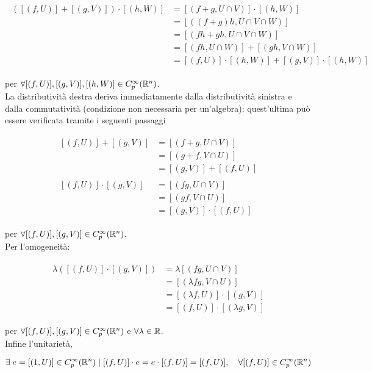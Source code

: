\begin{align}
	\begin{split}
		([(f,U)] + [(g,V)]) \cdot [(h,W)] &= [(f+g,U \cap V)] \cdot [(h,W)]\\
		&= [((f+g) h,U \cap V \cap W)]\\
		&= [(fh + gh,U \cap V \cap W)]\\
		&= [(fh,U \cap W)] + [(gh,V \cap W)]\\
		&= [(f,U)] \cdot [(h,W)] + [(g,V)] \cdot [(h,W)]
	\end{split}
\end{align}

per $ \forall [(f,U)], [(g,V)], [(h,W)] \in C_{p}^{\infty}(\mathbb{R}^{n}) $.\\
La distributività destra deriva immediatamente dalla distributività sinistra e dalla commutatività (condizione non necessaria per un'algebra): quest'ultima può essere verificata tramite i seguenti passaggi

\begin{align}
	\begin{split}
		[(f,U)] + [(g,V)] &= [(f+g,U \cap V)]\\
		&= [(g+f,V \cap U)]\\
		&= [(g,V)] + [(f,U)]\\\\
		[(f,U)] \cdot [(g,V)] &= [(fg,U \cap V)]\\
		&= [(gf,V \cap U)]\\
		&= [(g,V)] \cdot [(f,U)]
	\end{split}
\end{align}

per $ \forall [(f,U)], [(g,V)] \in C_{p}^{\infty}(\mathbb{R}^{n}) $.\\
Per l'omogeneità:

\begin{align}
	\begin{split}
		\lambda ([(f,U)] \cdot [(g,V)]) &= \lambda [(fg,U \cap V)]\\
		&= [(\lambda fg,V \cap U)]\\
		&= [(\lambda f,U)] \cdot [(g,V)]\\
		&= [(f,U)] \cdot [(\lambda g,V)]
	\end{split}
\end{align}

per $ \forall [(f,U)], [(g,V)] \in C_{p}^{\infty}(\mathbb{R}^{n}) $ e $ \forall \lambda \in \mathbb{R} $.\\
Infine l'unitarietà, \ie

\begin{equation}
	\E e = [(1,U)] \in C_{p}^{\infty}(\R^{n}) \mid [(f,U)] \cdot e = e \cdot [(f,U)] = [(f,U)] \qcomma \forall [(f,U)] \in C_{p}^{\infty}(\R^{n})
\end{equation}

